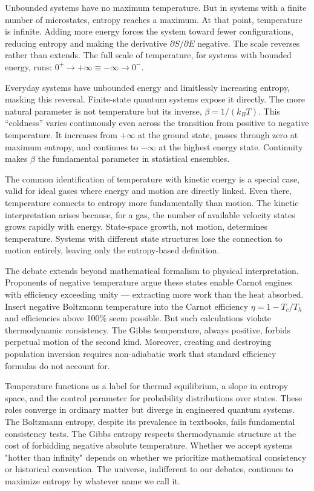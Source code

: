 Unbounded systems have no maximum temperature. But in systems with a finite number of microstates, entropy reaches a maximum. At that point, temperature is infinite. Adding more energy forces the system toward fewer configurations, reducing entropy and making the derivative $ \partial S/\partial E $ negative. The scale reverses rather than extends. The full scale of temperature, for systems with bounded energy, runs: $0^+ \to +\infty \equiv -\infty \to 0^-.$

Everyday systems have unbounded energy and limitlessly increasing entropy, masking this reversal. Finite-state quantum systems expose it directly. The more natural parameter is not temperature but its inverse, $ \beta = 1/(k_B T) $. This “coldness” varies continuously even across the transition from positive to negative temperature. It increases from $ +\infty $ at the ground state, passes through zero at maximum entropy, and continues to $ -\infty $ at the highest energy state. Continuity makes $ \beta $ the fundamental parameter in statistical ensembles.

The common identification of temperature with kinetic energy is a special case, valid for ideal gases where energy and motion are directly linked. Even there, temperature connects to entropy more fundamentally than motion. The kinetic interpretation arises because, for a gas, the number of available velocity states grows rapidly with energy. State-space growth, not motion, determines temperature. Systems with different state structures lose the connection to motion entirely, leaving only the entropy-based definition.

The debate extends beyond mathematical formalism to physical interpretation. Proponents of negative temperature argue these states enable Carnot engines with efficiency exceeding unity — extracting more work than the heat absorbed. Insert negative Boltzmann temperature into the Carnot efficiency $\eta = 1 - T_c/T_h$ and efficiencies above 100\% seem possible. But such calculations violate thermodynamic consistency. The Gibbs temperature, always positive, forbids perpetual motion of the second kind. Moreover, creating and destroying population inversion requires non-adiabatic work that standard efficiency formulas do not account for.

Temperature functions as a label for thermal equilibrium, a slope in entropy space, and the control parameter for probability distributions over states. These roles converge in ordinary matter but diverge in engineered quantum systems. The Boltzmann entropy, despite its prevalence in textbooks, fails fundamental consistency tests. The Gibbs entropy respects thermodynamic structure at the cost of forbidding negative absolute temperature. Whether we accept systems "hotter than infinity" depends on whether we prioritize mathematical consistency or historical convention. The universe, indifferent to our debates, continues to maximize entropy by whatever name we call it.
